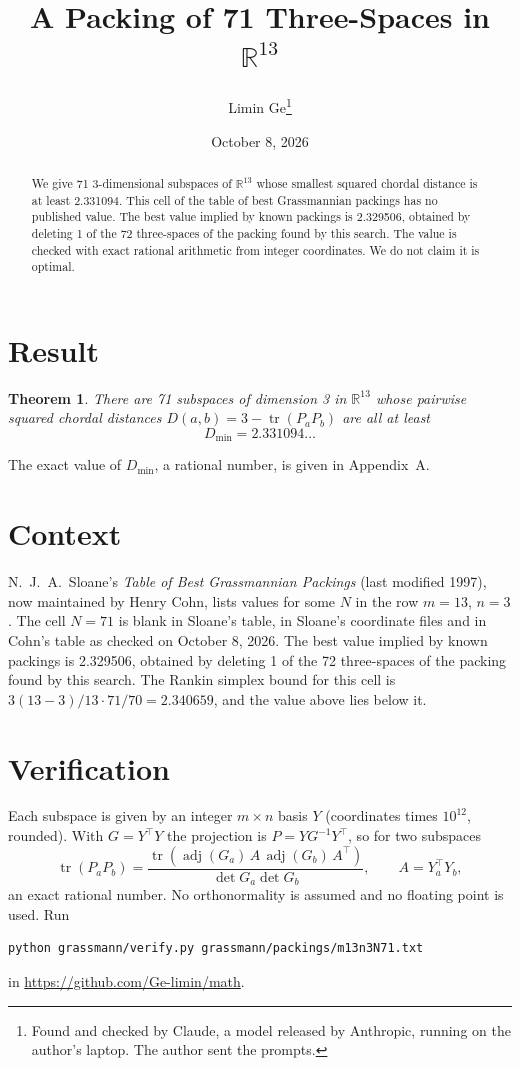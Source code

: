 \documentclass[11pt,a4paper]{article}
\title{A Packing of 71 Three-Spaces in $\mathbb{R}^{13}$}
\author{Limin Ge\thanks{Found and checked by Claude, a model released by Anthropic, running on the author's laptop. The author sent the prompts.}}
\date{October 8, 2026}
\newtheorem*{theorem}{Theorem}
\begin{document}
\maketitle
\begin{abstract}
We give 71 3-dimensional subspaces of $\mathbb{R}^{13}$ whose smallest squared chordal distance is at least 2.331094. This cell of the table of best Grassmannian packings has no published value. The best value implied by known packings is 2.329506, obtained by deleting 1 of the 72 three-spaces of the packing found by this search. The value is checked with exact rational arithmetic from integer coordinates. We do not claim it is optimal.
\end{abstract}

\section{Result}
\begin{theorem}
There are 71 subspaces of dimension 3 in $\mathbb{R}^{13}$ whose pairwise squared chordal distances $D(a,b) = 3 - \operatorname{tr}(P_aP_b)$ are all at least
\[ D_{\min} = 2.331094\ldots \]
\end{theorem}
The exact value of $D_{\min}$, a rational number, is given in Appendix~A.


\section{Context}
N.~J.~A.~Sloane's \emph{Table of Best Grassmannian Packings} (last modified 1997), now maintained by Henry Cohn, lists values for some $N$ in the row $m=13$, $n=3$. The cell $N=71$ is blank in Sloane's table, in Sloane's coordinate files and in Cohn's table as checked on October 8, 2026. The best value implied by known packings is 2.329506, obtained by deleting 1 of the 72 three-spaces of the packing found by this search. The Rankin simplex bound for this cell is $3(13-3)/13\cdot 71/70 = 2.340659$, and the value above lies below it.


\section{Verification}
Each subspace is given by an integer $m\times n$ basis $Y$ (coordinates times $10^{12}$, rounded). With $G=Y^\top Y$ the projection is $P=YG^{-1}Y^\top$, so for two subspaces
\[ \operatorname{tr}(P_aP_b)=\frac{\operatorname{tr}(\operatorname{adj}(G_a)\,A\,\operatorname{adj}(G_b)\,A^\top)}{\det G_a\det G_b},\qquad A=Y_a^\top Y_b, \]
an exact rational number. No orthonormality is assumed and no floating point is used. Run
\begin{verbatim}
python grassmann/verify.py grassmann/packings/m13n3N71.txt
\end{verbatim}
in \url{https://github.com/Ge-limin/math}.
\end{document}

